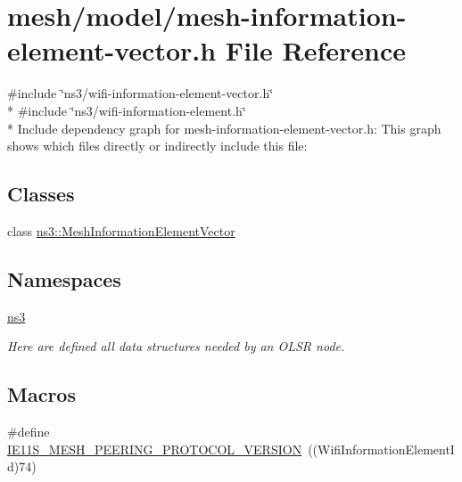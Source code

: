 \hypertarget{mesh-information-element-vector_8h}{}\section{mesh/model/mesh-\/information-\/element-\/vector.h File Reference}
\label{mesh-information-element-vector_8h}
{\ttfamily \#include \char`\"{}ns3/wifi-\/information-\/element-\/vector.\+h\char`\"{}}\\*
{\ttfamily \#include \char`\"{}ns3/wifi-\/information-\/element.\+h\char`\"{}}\\*
Include dependency graph for mesh-\/information-\/element-\/vector.h\+:
This graph shows which files directly or indirectly include this file\+:
\subsection*{Classes}
\begin{DoxyCompactItemize}
\item 
class \hyperlink{classns3_1_1MeshInformationElementVector}{ns3\+::\+Mesh\+Information\+Element\+Vector}
\end{DoxyCompactItemize}
\subsection*{Namespaces}
\begin{DoxyCompactItemize}
\item 
 \hyperlink{namespacens3}{ns3}
\begin{DoxyCompactList}\small\item\em Here are defined all data structures needed by an O\+L\+SR node. \end{DoxyCompactList}\end{DoxyCompactItemize}
\subsection*{Macros}
\begin{DoxyCompactItemize}
\item 
\#define \hyperlink{mesh-information-element-vector_8h_a59b39388f71ac433a6c7932fe4b31c4c}{I\+E11\+S\+\_\+\+M\+E\+S\+H\+\_\+\+P\+E\+E\+R\+I\+N\+G\+\_\+\+P\+R\+O\+T\+O\+C\+O\+L\+\_\+\+V\+E\+R\+S\+I\+ON}~((Wifi\+Information\+Element\+Id)74)
\end{DoxyCompactItemize}


